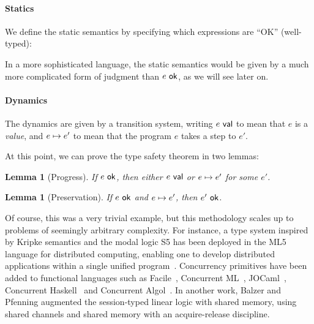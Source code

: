\documentclass{article}
\newtheorem{lemma}[theorem]{Lemma}
\begin{document}
\paragraph{Statics} We define the static semantics by specifying which
expressions are ``OK'' (well-typed):

In a more sophisticated language, the static semantics would be given
by a much more complicated form of judgment than ${e}\ \mathsf{ok}$, as we
will see later on.

\paragraph{Dynamics}
The dynamics are given by a transition system, writing ${e}\ \mathsf{val}$ to
mean that $e$ is a \emph{value}, and ${e}\mapsto{e'}$ to mean that the
program $e$ takes a step to $e'$.

At this point, we can prove the type safety theorem in two lemmas:
\begin{lemma}[Progress]
  If ${e}\ \mathsf{ok}$, then either ${e}\ \mathsf{val}$ or ${e}\mapsto{e'}$ for some
  $e'$.
\end{lemma}
\begin{lemma}[Preservation]
  If ${e}\ \mathsf{ok}$ and ${e}\mapsto{e'}$, then ${e'}\ \mathsf{ok}$.
\end{lemma}

Of course, this was a very trivial example, but this methodology
scales up to problems of seemingly arbitrary complexity. For instance,
a type system inspired by Kripke semantics and the modal logic S5 has
been deployed in the ML5 language for distributed computing, enabling
one to develop distributed applications within a single unified
program~\cite{murphy-crary-harper:2008}. Concurrency primitives have
been added to functional languages such as
Facile~\cite{giacolone:1989}, Concurrent ML~\cite{reppy:1991,reppy:2007},
JOCaml~\cite{conchon-fessant:1999}, Concurrent
Haskell~\cite{jones-gordon-finne:1996} and Concurrent
Algol~\cite{harper:2016}. In another work, Balzer and Pfenning
augmented the session-typed linear logic with shared memory, using
shared channels and shared memory with an acquire-release discipline.
\end{document}
